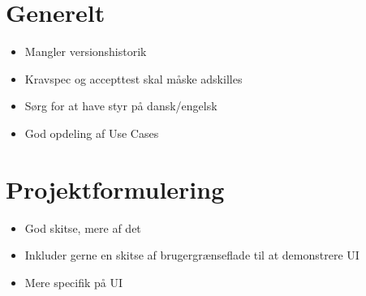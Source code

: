 \documentclass[a4paper,12pt,fleqn,oneside]{article}
\begin{document}

\newpage

\section{Generelt}
\begin{itemize}
    \item Mangler versionshistorik
    \item Kravspec og accepttest skal måske adskilles
    \item Sørg for at have styr på dansk/engelsk
    \item God opdeling af Use Cases
\end{itemize}

\section{Projektformulering}
\begin{itemize}
    \item God skitse, mere af det
    \item Inkluder gerne en skitse af brugergrænseflade til at demonstrere UI
    \item Mere specifik på UI
\end{itemize}
\end{document}
